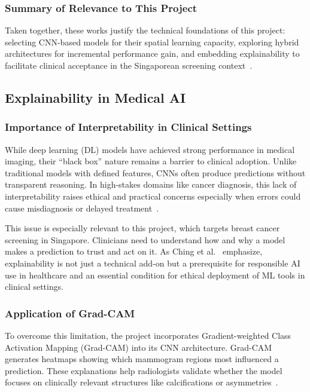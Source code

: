 \documentclass[12pt]{article}
\begin{document}
\subsubsection{Summary of Relevance to This Project}

Taken together, these works justify the technical foundations of this project: selecting CNN-based models for their spatial learning capacity, exploring hybrid architectures for incremental performance gain, and embedding explainability to facilitate clinical acceptance in the Singaporean screening context~\cite{1,6,7}.

\subsection{Explainability in Medical AI}

\subsubsection{Importance of Interpretability in Clinical Settings}

While deep learning (DL) models have achieved strong performance in medical imaging, their “black box” nature remains a barrier to clinical adoption. Unlike traditional models with defined features, CNNs often produce predictions without transparent reasoning. In high-stakes domains like cancer diagnosis, this lack of interpretability raises ethical and practical concerns especially when errors could cause misdiagnosis or delayed treatment~\cite{3}.

This issue is especially relevant to this project, which targets breast cancer screening in Singapore. Clinicians need to understand how and why a model makes a prediction to trust and act on it. As Ching et al.~\cite{3} emphasize, explainability is not just a technical add-on but a prerequisite for responsible AI use in healthcare and an essential condition for ethical deployment of ML tools in clinical settings.

\subsubsection{Application of Grad-CAM}

To overcome this limitation, the project incorporates Gradient-weighted Class Activation Mapping (Grad-CAM) into its CNN architecture. Grad-CAM generates heatmaps showing which mammogram regions most influenced a prediction. These explanations help radiologists validate whether the model focuses on clinically relevant structures like calcifications or asymmetries~\cite{5}.
\end{document}
